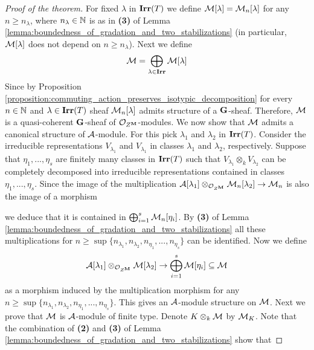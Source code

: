 \begin{proof}[Proof of the theorem]
For fixed $\lambda$ in $\mathbf{Irr}(T)$ we define ${\mathcal M}[\lambda] = {\mathcal M}_n[\lambda]$ for any $n\geq n_{\lambda}$, where $n_{\lambda}\in {\mathbb N}$ is as in \textbf{(3)} of Lemma \ref{lemma:boundedness_of_gradation_and_two_stabilizations} (in particular, ${\mathcal M}[\lambda]$ does not depend on $n\geq n_{\lambda}$). Next we define
$${\mathcal M} = \bigoplus_{\lambda\in \mathbf{Irr}}{\mathcal M}[\lambda]$$
Since by Proposition \ref{proposition:commuting_action_preserves_isotypic_decomposition} for every $n\in {\mathbb N}$ and $\lambda \in \mathbf{Irr}(T)$ sheaf ${\mathcal M}_n[\lambda]$ admits structure of a $\mathbf{G}$-sheaf. Therefore, ${\mathcal M}$ is a quasi-coherent $\mathbf{G}$-sheaf of ${\mathcal O}_{Z^{\mathbf{M}}}$-modules. We now show that ${\mathcal M}$ admits a canonical structure of ${\mathcal A}$-module. For this pick $\lambda_1$ and $\lambda_2$ in $\mathbf{Irr}(T)$. Consider the irreducible representations $V_{\lambda_1}$ and $V_{\lambda_1}$ in classes $\lambda_1$ and $\lambda_2$, respectively. Suppose that $\eta_1,...,\eta_s$ are finitely many classes in $\mathbf{Irr}(T)$ such that $V_{\lambda_1}\otimes_k V_{\lambda_2}$ can be completely decomposed into irreducible representations contained in classes $\eta_1,...,\eta_s$. Since the image of the multiplication ${\mathcal A}[\lambda_1]\otimes_{{\mathcal O}_{Z^{\mathbf{M}}}}{\mathcal M}_n[\lambda_2]\rightarrow {\mathcal M}_n$ is also the image of a morphism
\begin{center}
\end{center}
we deduce that it is contained in $\bigoplus_{i=1}^s{\mathcal M}_n[\eta_i]$. By \textbf{(3)} of Lemma \ref{lemma:boundedness_of_gradation_and_two_stabilizations} all these multiplications for $n\geq \sup \{n_{\lambda_1},n_{\lambda_2},n_{\eta_1},...,n_{\eta_s}\}$ can be identified. Now we define
$${\mathcal A}[\lambda_1]\otimes_{{\mathcal O}_{Z^{\mathbf{M}}}} {\mathcal M}[\lambda_2]\rightarrow  \bigoplus_{i=1}^s{\mathcal M}[\eta_i]\subseteq {\mathcal M}$$
as a morphism induced by the multiplication morphism for any $n\geq \sup\{n_{\lambda_1},n_{\lambda_2},n_{\eta_1},...,n_{\eta_s}\}$. This gives an ${\mathcal A}$-module structure on ${\mathcal M}$. Next we prove that ${\mathcal M}$ is ${\mathcal A}$-module of finite type. Denote $K\otimes_k{\mathcal M}$ by ${\mathcal M}_K$. Note that the combination of \textbf{(2)} and \textbf{(3)} of Lemma \ref{lemma:boundedness_of_gradation_and_two_stabilizations} show that

\end{proof}
